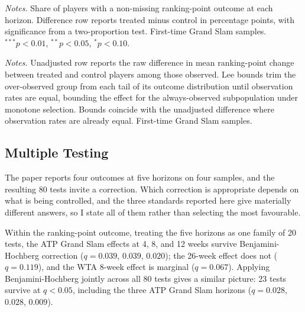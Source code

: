 \begin{table}[htbp]
\centering
\caption{Attrition: Outcome Observation Rates by Treatment Status}
\label{tab:attrition}
\begin{threeparttable}
\small

\begin{tablenotes}
\footnotesize
\item \textit{Notes.} Share of players with a non-missing ranking-point outcome at each horizon. Difference row reports treated minus control in percentage points, with significance from a two-proportion test. First-time Grand Slam samples. $^{***}p<0.01$, $^{**}p<0.05$, $^{*}p<0.10$.
\end{tablenotes}
\end{threeparttable}
\end{table}

\begin{table}[htbp]
\centering
\caption{Lee (2009) Bounds on the Ranking-Point Effect}
\label{tab:lee}
\begin{threeparttable}
\small

\begin{tablenotes}
\footnotesize
\item \textit{Notes.} Unadjusted row reports the raw difference in mean ranking-point change between treated and control players among those observed. Lee bounds trim the over-observed group from each tail of its outcome distribution until observation rates are equal, bounding the effect for the always-observed subpopulation under monotone selection. Bounds coincide with the unadjusted difference where observation rates are already equal. First-time Grand Slam samples.
\end{tablenotes}
\end{threeparttable}
\end{table}

\subsection{Multiple Testing}
\label{sec:robustness_mht}

The paper reports four outcomes at five horizons on four samples, and the resulting 80 tests invite a correction. Which correction is appropriate depends on what is being controlled, and the three standards reported here give materially different answers, so I state all of them rather than selecting the most favourable.

Within the ranking-point outcome, treating the five horizons as one family of 20 tests, the ATP Grand Slam effects at 4, 8, and 12 weeks survive Benjamini-Hochberg correction ($q = 0.039$, $0.039$, $0.020$); the 26-week effect does not ($q = 0.119$), and the WTA 8-week effect is marginal ($q = 0.067$). Applying Benjamini-Hochberg jointly across all 80 tests gives a similar picture: 23 tests survive at $q < 0.05$, including the three ATP Grand Slam horizons ($q = 0.028$, $0.028$, $0.009$).

